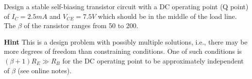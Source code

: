 


% 

\item Design a stable self-biasing transistor circuit with a DC operating
point (Q point) of $I_C=2.5mA$ and $V_{CE}=7.5V$ which should be in the 
middle of the load line. The $\beta$ of the ransistor ranges from 50 to
200. 

{\bf Hint} This is a design problem with possibly multiple solutions, 
i.e., there may be more degrees of freedom than constraining conditions. 
One of such conditions is $(\beta+1)R_E \gg R_B$ for the DC operating 
point to be approximately independent of $\beta$ (see online notes). 


% 

